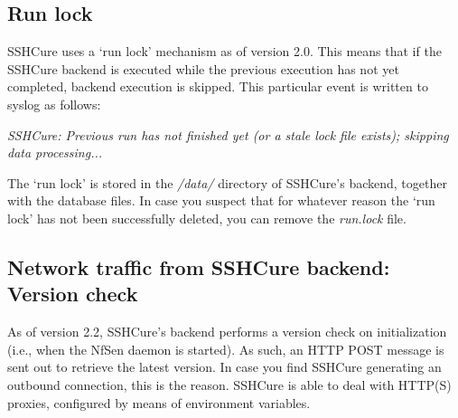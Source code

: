 \subsection{Run lock}

SSHCure uses a `run lock' mechanism as of version 2.0. This means that if the SSHCure backend is executed while the previous execution has not yet completed, backend execution is skipped. This particular event is written to syslog as follows:

\begin{center}
\textit{SSHCure: Previous run has not finished yet (or a stale lock file exists); skipping data processing...}
\end{center}

The `run lock' is stored in the \textit{/data/} directory of SSHCure's backend, together with the database files. In case you suspect that for whatever reason the `run lock' has not been successfully deleted, you can remove the \textit{run.lock} file.

\subsection{Network traffic from SSHCure backend: Version check}

As of version 2.2, SSHCure's backend performs a version check on initialization (i.e., when the NfSen daemon is started). As such, an HTTP POST message is sent out to retrieve the latest version. In case you find SSHCure generating an outbound connection, this is the reason. SSHCure is able to deal with HTTP(S) proxies, configured by means of environment variables.
